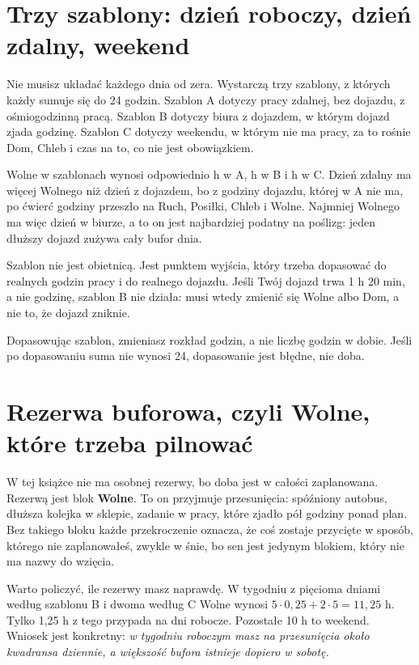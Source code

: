 \section{Trzy szablony: dzień roboczy, dzień zdalny, weekend}

Nie musisz układać każdego dnia od zera. Wystarczą trzy szablony, z których każdy sumuje się do 24 godzin. Szablon A dotyczy pracy zdalnej, bez dojazdu, z ośmiogodzinną pracą. Szablon B dotyczy biura z dojazdem, w którym dojazd zjada godzinę. Szablon C dotyczy weekendu, w którym nie ma pracy, za to rośnie Dom, Chleb i czas na to, co nie jest obowiązkiem.


Wolne w szablonach wynosi odpowiednio  h w A,  h w B i  h w C. Dzień zdalny ma więcej Wolnego niż dzień z dojazdem, bo z godziny dojazdu, której w A nie ma, po ćwierć godziny przeszło na Ruch, Posiłki, Chleb i Wolne. Najmniej Wolnego ma więc dzień w biurze, a to on jest najbardziej podatny na poślizg: jeden dłuższy dojazd zużywa cały bufor dnia.

Szablon nie jest obietnicą. Jest punktem wyjścia, który trzeba dopasować do realnych godzin pracy i do realnego dojazdu. Jeśli Twój dojazd trwa 1 h 20 min, a nie godzinę, szablon B nie działa: musi wtedy zmienić się Wolne albo Dom, a nie to, że dojazd \glqq zniknie\grqq{}.

\begin{zasada}
Dopasowując szablon, zmieniasz rozkład godzin, a nie liczbę godzin w dobie. Jeśli po dopasowaniu suma nie wynosi 24, dopasowanie jest błędne, nie doba.
\end{zasada}

\section{Rezerwa buforowa, czyli Wolne, które trzeba pilnować}

W tej książce nie ma osobnej rezerwy, bo doba jest w całości zaplanowana. Rezerwą jest blok \textbf{Wolne}. To on przyjmuje przesunięcia: spóźniony autobus, dłuższa kolejka w sklepie, zadanie w pracy, które zjadło pół godziny ponad plan. Bez takiego bloku każde przekroczenie oznacza, że coś zostaje przycięte w sposób, którego nie zaplanowałeś, zwykle w śnie, bo sen jest jedynym blokiem, który nie ma nazwy \glqq do wzięcia\grqq{}.

Warto policzyć, ile rezerwy masz naprawdę. W tygodniu z pięcioma dniami według szablonu B i dwoma według C Wolne wynosi $5 \cdot 0{,}25 + 2 \cdot 5 = 11{,}25$ h. Tylko 1,25 h z tego przypada na dni robocze. Pozostałe 10 h to weekend. Wniosek jest konkretny: \emph{w tygodniu roboczym masz na przesunięcia około kwadransa dziennie, a większość bufora istnieje dopiero w sobotę.}

